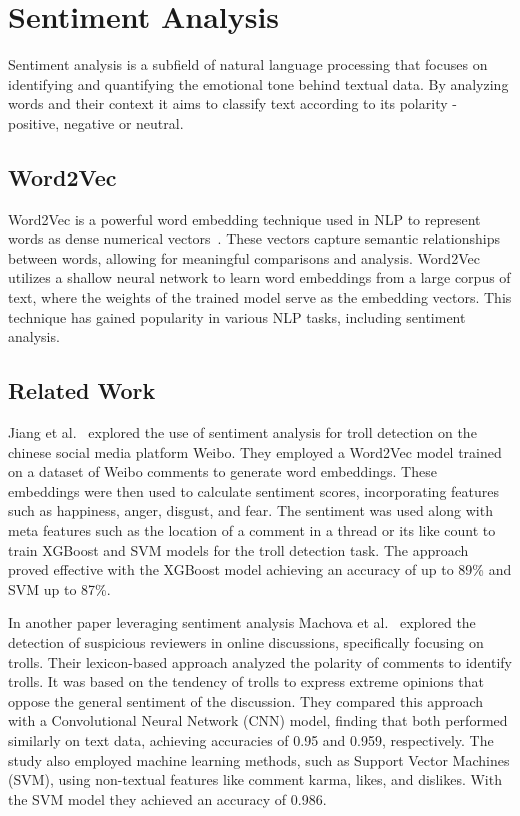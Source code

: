 \documentclass[twoside]{ctuthesis}
\theoremstyle{plain}
\theoremstyle{definition}
\theoremstyle{note}
\begin{document}
\section{Sentiment Analysis}
Sentiment analysis is a subfield of natural language processing that focuses on identifying and quantifying the emotional tone behind textual data. By analyzing words and their context  it aims to classify text according to its polarity - positive, negative or neutral.\par

\subsection{Word2Vec}
Word2Vec is a powerful word embedding technique used in NLP to represent words as dense numerical vectors~\cite{Mikolov2013Word2vec}. These vectors capture semantic relationships between words, allowing for meaningful comparisons and analysis. Word2Vec utilizes a shallow neural network to learn word embeddings from a large corpus of text, where the weights of the trained model serve as the embedding vectors. This technique has gained popularity in various NLP tasks, including   sentiment analysis.

\subsection{Related Work}
Jiang et al.~\cite{Jiang2021Sentiment} explored the use of sentiment analysis for troll detection on the chinese social media platform Weibo.  They employed a Word2Vec model trained on a dataset of Weibo comments to generate word embeddings. These embeddings were then used to calculate sentiment scores, incorporating features such as happiness, anger, disgust, and fear. The sentiment was used along with meta features such as the location of a comment in a thread or its like count to train XGBoost and SVM models for the troll detection task. The approach proved effective with the XGBoost model achieving an accuracy of up to 89\% and SVM up to 87\%.\par
In another paper leveraging sentiment analysis Machova et al.~\cite{Machova2022Comparison} explored the detection of suspicious reviewers in online discussions, specifically focusing on trolls. Their lexicon-based approach analyzed the polarity of comments to identify trolls. It was based on the tendency of trolls to express extreme opinions that oppose the general sentiment of the discussion. They compared this approach with a Convolutional Neural Network (CNN) model, finding that both performed similarly on text data, achieving accuracies of 0.95 and 0.959, respectively.  The study also employed machine learning methods, such as Support Vector Machines (SVM), using non-textual features like comment karma, likes, and dislikes. With the SVM model they achieved an accuracy of 0.986.
\end{document}
